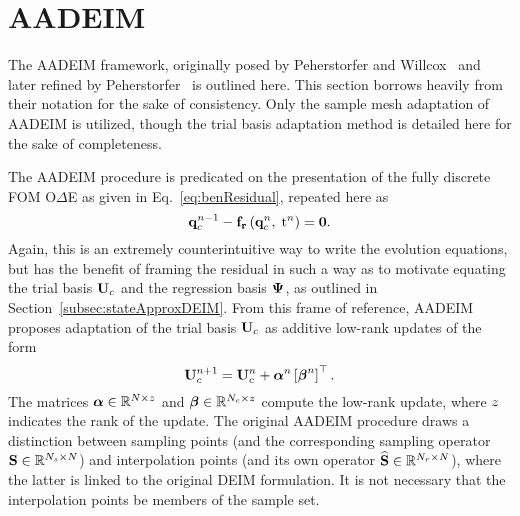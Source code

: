 \section{AADEIM}

The AADEIM framework, originally posed by Peherstorfer and Willcox~\cite{Peherstorfer2015} and later refined by Peherstorfer~\cite{Peherstorfer2020Adaptive} is outlined here. This section borrows heavily from their notation for the sake of consistency. Only the sample mesh adaptation of AADEIM is utilized, though the trial basis adaptation method is detailed here for the sake of completeness.

The AADEIM procedure is predicated on the presentation of the fully discrete FOM O$\Delta$E as given in Eq.~\ref{eq:benResidual}, repeated here as
%
\begin{equation}
	\mathbf{q}_{c}^{n-1} - \mathbf{f}_{\mathbf{r}}\left(\mathbf{q}_{c}^{n},\; \text{t}^{n}\right) = \mathbf{0}.
\end{equation}
%
Again, this is an extremely counterintuitive way to write the evolution equations, but has the benefit of framing the residual in such a way as to motivate equating the trial basis $\consTrial$ and the regression basis $\deimBasis$, as outlined in Section~\ref{subsec:stateApproxDEIM}. From this frame of reference, AADEIM proposes adaptation of the trial basis $\consTrial$ as additive low-rank updates of the form
%
\begin{equation}
	\consTrial^{\timeIdx+1} = \consTrial^{\timeIdx} + \adeimAlpha^{\timeIdx} \left[\adeimBeta^{\timeIdx}\right]^\top.
\end{equation}
%
The matrices $\boldsymbol{\alpha} \in \mathbb{R}^{N \times z}$ and $\boldsymbol{\beta} \in \mathbb{R}^{N_c \times z}$ compute the low-rank update, where $z$ indicates the rank of the update. The original AADEIM procedure draws a distinction between sampling points (and the corresponding sampling operator $\mathbf{S} \in \mathbb{R}^{N_s \times N}$) and interpolation points (and its own operator $\mathbf{\widehat{S}} \in \mathbb{R}^{N_r \times N}$), where the latter is linked to the original DEIM formulation. It is not necessary that the interpolation points be members of the sample set.

